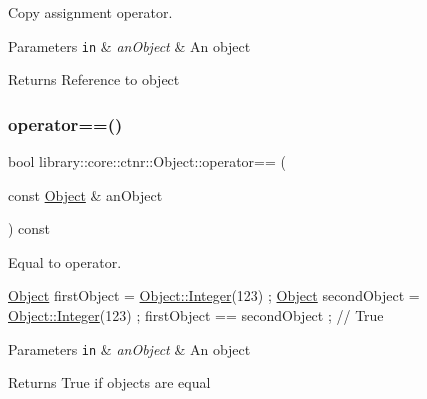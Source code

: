 Copy assignment operator. 


\begin{DoxyParams}[1]{Parameters}
\mbox{\tt in}  & {\em an\+Object} & An object \\
\hline
\end{DoxyParams}
\begin{DoxyReturn}{Returns}
Reference to object 
\end{DoxyReturn}
\mbox{\label{classlibrary_1_1core_1_1ctnr_1_1_object_a543801cb9c7c22432603aca5435595e9}} 
\subsubsection{\texorpdfstring{operator==()}{operator==()}}
{\footnotesize\ttfamily bool library\+::core\+::ctnr\+::\+Object\+::operator== (\begin{DoxyParamCaption}\item[{const \hyperlink{classlibrary_1_1core_1_1ctnr_1_1_object}{Object} \&}]{an\+Object }\end{DoxyParamCaption}) const}



Equal to operator. 


\begin{DoxyCode}
\hyperlink{classlibrary_1_1core_1_1ctnr_1_1_object_a51bb72dec3a1b2738e0ad92b977b8d8d}{Object} firstObject = \hyperlink{classlibrary_1_1core_1_1ctnr_1_1_object_a8a8b1ef718d092c154011cf5c37373bb}{Object::Integer}(123) ;
\hyperlink{classlibrary_1_1core_1_1ctnr_1_1_object_a51bb72dec3a1b2738e0ad92b977b8d8d}{Object} secondObject = \hyperlink{classlibrary_1_1core_1_1ctnr_1_1_object_a8a8b1ef718d092c154011cf5c37373bb}{Object::Integer}(123) ;
firstObject == secondObject ; \textcolor{comment}{// True}
\end{DoxyCode}



\begin{DoxyParams}[1]{Parameters}
\mbox{\tt in}  & {\em an\+Object} & An object \\
\hline
\end{DoxyParams}
\begin{DoxyReturn}{Returns}
True if objects are equal 
\end{DoxyReturn}
\mbox{\label{classlibrary_1_1core_1_1ctnr_1_1_object_a376782120a993c568de4388f642a6544}} 
